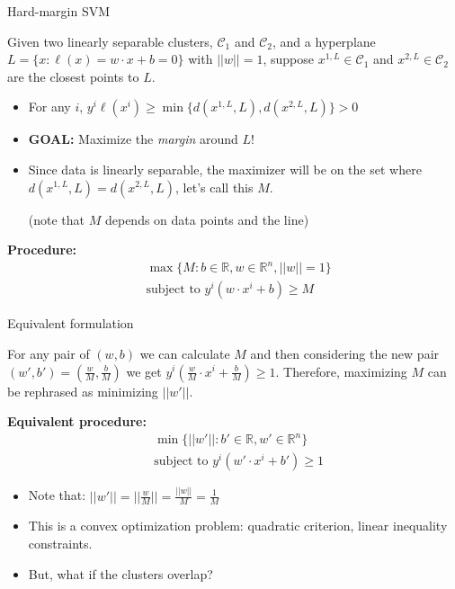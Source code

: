 \documentclass{beamer}
\begin{document}
\begin{frame}{Hard-margin SVM}

Given two linearly separable clusters, $\mathcal{C}_1$ and $\mathcal{C}_2$, and a hyperplane $L=\{x:\ell(x) = w\cdot x + b = 0\}$ with $||w||=1$, suppose $x^{1,L} \in \mathcal{C}_1$ and $x^{2,L} \in \mathcal{C}_2$ are the closest points to $L$.
\begin{itemize}
    \item For any $i$, $y^i\ell(x^i) \geq \min \{d(x^{1,L},L), d(x^{2,L},L)\}> 0 $
    \item \textbf{GOAL:} Maximize the \textit{margin} around $L$! %
    \item Since data is linearly separable, the maximizer will be on the set where $d(x^{1,L},L)=d(x^{2,L},L)$, let's call this $M$.
    
    (note that $M$ depends on data points and the line)
\end{itemize}
\vspace{0.5cm}
\pause
\textbf{Procedure:}
\begin{align}
& \max \{M:b\in\mathbb{R}, w \in\mathbb{R}^n, ||w||=1\} \\
& \text{subject to } y^i(w\cdot x^i + b)\geq M
\end{align}

\end{frame}


\begin{frame}{Equivalent formulation}

For any pair of $(w,b)$ we can calculate $M$ and then considering the new pair $(w',b')=(\frac{w}{M}, \frac{b}{M})$ we get $y^i(\frac{w}{M}\cdot x^i + \frac{b}{M})\geq 1$. Therefore, maximizing $M$ can be rephrased as minimizing $||w'||$.

\vspace{0.5cm}

\textbf{Equivalent procedure:}
\begin{align}
& \min \{||w'||:b'\in\mathbb{R}, w' \in\mathbb{R}^n\} \\
& \text{subject to } y^i(w'\cdot x^i + b')\geq 1
\end{align}
\begin{itemize}
    \item Note that: $||w'||=||\frac{w}{M}||=\frac{||w||}{M}=\frac{1}{M}$
    \item This is a convex optimization problem: quadratic criterion, linear inequality constraints.
    \item But, what if the clusters overlap?
\end{itemize}
\end{frame}
\end{document}
